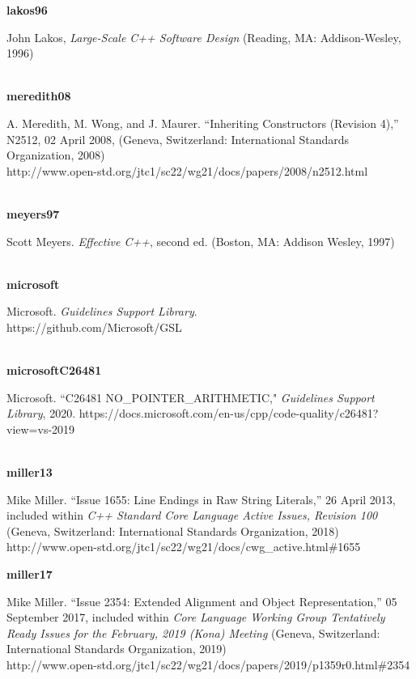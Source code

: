 \noindent\textbf{lakos96}\\
\hspace*{2em}\parbox[t]{\textwidth}{John Lakos, \textit{Large-Scale C++ Software Design} (Reading, MA: Addison-Wesley, 1996)} \\

\noindent\textbf{meredith08}\\
\hspace*{2em}\parbox[t]{\textwidth}{A. Meredith, M. Wong, and J. Maurer. ``Inheriting Constructors (Revision 4),” N2512, 02 April 2008,  (Geneva, Switzerland: International Standards Organization, 2008)\\
http://www.open-std.org/jtc1/sc22/wg21/docs/papers/2008/n2512.html}\\

\noindent\textbf{meyers97}\\
\hspace*{2em}\parbox[t]{\textwidth}{Scott Meyers. \textit{Effective C++}, second ed. (Boston, MA: Addison Wesley, 1997)} \\

\noindent\textbf{microsoft}\\
\hspace*{2em}\parbox[t]{\textwidth}{Microsoft. \textit{Guidelines Support Library}.\\
https://github.com/Microsoft/GSL}\\

\noindent\textbf{microsoftC26481}\\
\hspace*{2em}\parbox[t]{\textwidth}{Microsoft. ``C26481 NO\_POINTER\_ARITHMETIC," \textit{Guidelines Support Library}, 2020.
https://docs.microsoft.com/en-us/cpp/code-quality/c26481?view=vs-2019}\\

\noindent\textbf{miller13}\\
\hspace*{2em}\parbox[t]{\textwidth}{Mike Miller. ``Issue 1655: Line Endings in Raw String Literals,” 26 April 2013, included within \textit{C++ Standard Core Language Active Issues, Revision 100} (Geneva, Switzerland: International Standards Organization, 2018)\\
http://www.open-std.org/jtc1/sc22/wg21/docs/cwg\_active.html\#1655}

\noindent\textbf{miller17}\\
\hspace*{2em}\parbox[t]{\textwidth}{Mike Miller. ``Issue 2354: Extended Alignment and Object Representation,” 05 September 2017, included within \textit{Core Language Working Group Tentatively Ready Issues for the February, 2019 (Kona) Meeting} (Geneva, Switzerland: International Standards Organization, 2019)\\
http://www.open-std.org/jtc1/sc22/wg21/docs/papers/2019/p1359r0.html\#2354}\\

